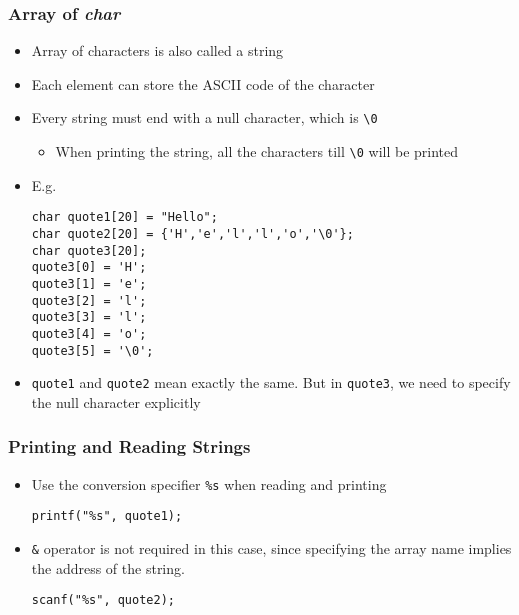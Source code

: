 \documentclass[11pt]{beamer}
\begin{document}
\begin{frame}[fragile]\frametitle{Array of \emph{char}}
\label{sec-1-4}

\begin{itemize}
\item Array of characters is also called a string
\item Each element can store the ASCII code of the character
\item Every string must end with a null character, which is \verb~\0~
\begin{itemize}
\item When printing the string, all the characters till \verb~\0~ will be printed
\end{itemize}
\item E.g.

\begin{verbatim}
char quote1[20] = "Hello";
char quote2[20] = {'H','e','l','l','o','\0'};
char quote3[20];
quote3[0] = 'H';
quote3[1] = 'e';
quote3[2] = 'l';
quote3[3] = 'l';
quote3[4] = 'o';
quote3[5] = '\0';
\end{verbatim}
\item \verb~quote1~ and \verb~quote2~ mean exactly the same. But in \verb~quote3~, we need to specify the null character explicitly
\end{itemize}
\end{frame}
\begin{frame}[fragile]\frametitle{Printing and Reading Strings}
\label{sec-1-5}

\begin{itemize}
\item Use the conversion specifier \verb~%s~ when reading and printing

\begin{verbatim}
printf("%s", quote1);
\end{verbatim}
\item \verb~&~ operator is not required in this case, since specifying the array name implies the address of the string. 

\begin{verbatim}
scanf("%s", quote2);
\end{verbatim}
\end{itemize}
\end{frame}
\end{document}
